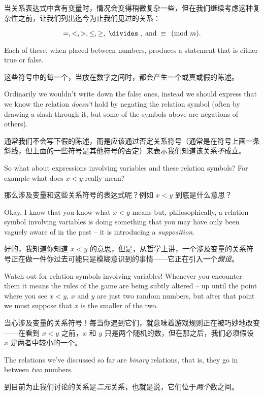 当关系表达式中含有变量时，情况会变得稍微复杂一些，但在我们继续考虑这种复杂性之前，让我们列出迄今为止我们见过的关系：

\[ =, <, >, \leq, \geq,\; \divides \; , \; \mbox{and} \; \equiv \pmod{m}. \] 

Each of these, when placed between numbers, produces a statement that
is either true or false.

这些符号中的每一个，当放在数字之间时，都会产生一个或真或假的陈述。

Ordinarily we wouldn't write down the 
false ones, instead we should express that we know the relation
\emph{doesn't} hold by negating the relation symbol (often by
drawing a slash through it, but some of the symbols above are
negations of others).

通常我们不会写下假的陈述，而是应该通过否定关系符号（通常是在符号上画一条斜线，但上面的一些符号是其他符号的否定）来表示我们知道该关系\emph{不}成立。

So what about expressions involving variables and these relation symbols?
For example what does $x < y$ really mean?

那么涉及变量和这些关系符号的表达式呢？例如 $x < y$ 到底是什么意思？

Okay, I know that you know 
what $x < y$ means but, philosophically, a relation symbol involving variables
is doing something that you may have only been vaguely aware of in the 
past -- it is introducing a \emph{supposition}.

好的，我知道你知道 $x < y$ 的意思，但是，从哲学上讲，一个涉及变量的关系符号正在做一件你过去可能只是模糊意识到的事情——它正在引入一个\emph{假设}。

Watch out for relation
symbols involving variables!  Whenever you encounter them it means the 
rules of the game are being subtly altered -- up until the point where 
you see $x < y$, $x$ and $y$ are just two random numbers, but after that
point we must suppose that $x$ is the smaller of the two.

当心涉及变量的关系符号！每当你遇到它们，就意味着游戏规则正在被巧妙地改变——在看到 $x < y$ 之前，$x$ 和 $y$ 只是两个随机的数，但在那之后，我们必须假设 $x$ 是两者中较小的一个。

The relations we've discussed so far are  
\emph{binary} relations, that
is, they go in between \emph{two} numbers.

到目前为止我们讨论的关系是\emph{二元}关系，也就是说，它们位于\emph{两个}数之间。

